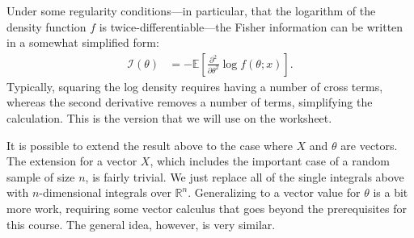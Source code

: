 \documentclass{tufte-handout}
\begin{document}
Under some regularity conditions---in particular, that the logarithm of the
density function $f$ is twice-differentiable---the Fisher information can be
written in a somewhat simplified form:
\begin{align*}
\mathcal{I}(\theta) &= - \mathbb{E} \left[ \frac{\partial^2}{\partial \theta^2} \log f(\theta; x) \right].
\end{align*}
Typically, squaring the log density requires having a number of cross terms,
whereas the second derivative removes a number of terms, simplifying the 
calculation. This is the version that we will use on the worksheet.

\vspace*{18pt}

\noindent
It is possible to extend the result above to the case where $X$ and $\theta$
are vectors. The extension for a vector $X$, which includes the important case
of a random sample of size $n$, is fairly trivial. We just replace all of the
single integrals above with $n$-dimensional integrals over $\mathbb{R}^n$. 
Generalizing to a vector value for $\theta$ is a bit more work, requiring 
some vector calculus that goes beyond the prerequisites for this course. 
The general idea, however, is very similar.
\end{document}
